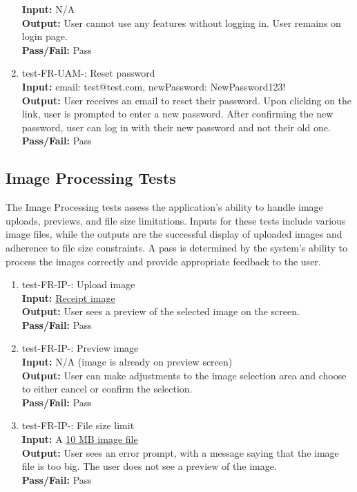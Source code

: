 \documentclass[12pt, titlepage]{article}
\begin{document}
\begin{enumerate}
  \textbf{Input:} N/A\\
  \textbf{Output:} User cannot use any features without logging in. User remains
  on login page.\\
  \textbf{Pass/Fail:} Pass\\
\item test-FR-UAM-: Reset password\\
  \textbf{Input:} email: test@test.com, newPassword: NewPassword123!\\
  \textbf{Output:} User receives an email to reset their password. Upon clicking
  on the link, user is prompted to enter a new password. After confirming the
  new password, user can log in with their new password and not their old one.\\
  \textbf{Pass/Fail:} Pass\\
\end{enumerate}

\subsection{Image Processing Tests}
The Image Processing tests assess the application's ability to handle image uploads, 
previews, and file size limitations. Inputs for these tests include various image files, 
while the outputs are the successful display of uploaded images and adherence to file size 
constraints. A pass is determined by the system's ability to process the images correctly 
and provide appropriate feedback to the user.

\begin{enumerate}
  \item test-FR-IP-: Upload image\\
    \textbf{Input:}
    \href{https://github.com/PlutosCapstone/Plutos/blob/main/src/server/tests/imageProcessing/data/parsing/input/foodbasics_1.jpg}{Receipt
    image}\\
    \textbf{Output:} User sees a preview of the selected image on the screen.\\
    \textbf{Pass/Fail:} Pass\\
  \item test-FR-IP-: Preview image\\
    \textbf{Input:} N/A (image is already on preview screen) \\
    \textbf{Output:} User can make adjustments to the image selection area and
    choose to either cancel or confirm the selection.\\
    \textbf{Pass/Fail:} Pass\\
  \item test-FR-IP-: File size limit\\
    \textbf{Input:} A
    \href{https://sample-videos.com/img/Sample-jpg-image-10mb.jpg}{10 MB image
    file}\\
    \textbf{Output:} User sees an error prompt, with a message saying that the
    image file is too big. The user does not see a preview of the image.\\
    \textbf{Pass/Fail:} Pass\\
\end{enumerate}
\end{document}
